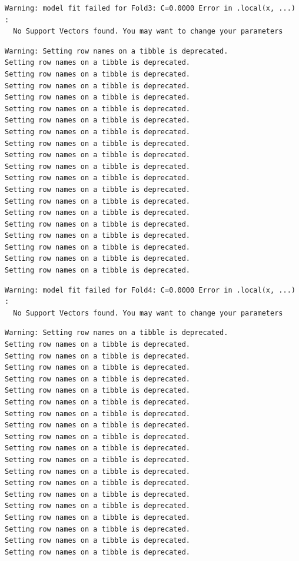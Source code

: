 \documentclass[
  letterpaper,
  DIV=11,
  numbers=noendperiod]{scrartcl}
\begin{document}
\begin{verbatim}
Warning: model fit failed for Fold3: C=0.0000 Error in .local(x, ...) : 
  No Support Vectors found. You may want to change your parameters
\end{verbatim}

\begin{verbatim}
Warning: Setting row names on a tibble is deprecated.
Setting row names on a tibble is deprecated.
Setting row names on a tibble is deprecated.
Setting row names on a tibble is deprecated.
Setting row names on a tibble is deprecated.
Setting row names on a tibble is deprecated.
Setting row names on a tibble is deprecated.
Setting row names on a tibble is deprecated.
Setting row names on a tibble is deprecated.
Setting row names on a tibble is deprecated.
Setting row names on a tibble is deprecated.
Setting row names on a tibble is deprecated.
Setting row names on a tibble is deprecated.
Setting row names on a tibble is deprecated.
Setting row names on a tibble is deprecated.
Setting row names on a tibble is deprecated.
Setting row names on a tibble is deprecated.
Setting row names on a tibble is deprecated.
Setting row names on a tibble is deprecated.
Setting row names on a tibble is deprecated.
\end{verbatim}

\begin{verbatim}
Warning: model fit failed for Fold4: C=0.0000 Error in .local(x, ...) : 
  No Support Vectors found. You may want to change your parameters
\end{verbatim}

\begin{verbatim}
Warning: Setting row names on a tibble is deprecated.
Setting row names on a tibble is deprecated.
Setting row names on a tibble is deprecated.
Setting row names on a tibble is deprecated.
Setting row names on a tibble is deprecated.
Setting row names on a tibble is deprecated.
Setting row names on a tibble is deprecated.
Setting row names on a tibble is deprecated.
Setting row names on a tibble is deprecated.
Setting row names on a tibble is deprecated.
Setting row names on a tibble is deprecated.
Setting row names on a tibble is deprecated.
Setting row names on a tibble is deprecated.
Setting row names on a tibble is deprecated.
Setting row names on a tibble is deprecated.
Setting row names on a tibble is deprecated.
Setting row names on a tibble is deprecated.
Setting row names on a tibble is deprecated.
Setting row names on a tibble is deprecated.
Setting row names on a tibble is deprecated.
\end{verbatim}
\end{document}
